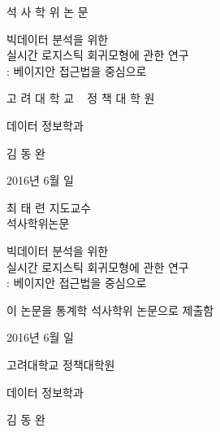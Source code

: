 \documentclass[oneside,b5paper,11pt]{book}
\theoremstyle{plain}
\theoremstyle{definition}
\theoremstyle{remark}
\theoremstyle{definition}
\numberwithin{equation}{chapter}
\begin{document}

 \linespread{1.0}
 \thispagestyle{empty}
 \vspace{37mm}
 \begin{center}
 {\Large 석 사 학 위 논 문}
 \end{center}
 \vspace{30mm}
 \begin{center}
 \LARGE 빅데이터 분석을 위한 \\실시간 로지스틱 회귀모형에 관한 연구\\: 베이지안 접근법을 중심으로
 \end{center}
 \vspace{80mm}
 \begin{center}
 {\Large 고 려 대 학 교 ~ 정 책 대 학 원}
 \end{center}
 \begin{center}
 {\Large 데이터 정보학과}
 \end{center}
 \begin{center}
 {\Large 김 \quad\quad 동 \quad\quad 완}
 \end{center}
  \vspace{7mm}
 \begin{center}
 {\Large 2016년 \quad 6월 \quad 일}
 \end{center}
 \linespread{1.6}





\newpage{}
 \linespread{1.0}
 \thispagestyle{empty}
 \vspace{15mm}
 \begin{center}
 {\Large 최 태 련 지도교수 \\ 석사학위논문
}
 \end{center}
 \vspace{20mm}
 \begin{center}
 \LARGE 빅데이터 분석을 위한 \\실시간 로지스틱 회귀모형에 관한 연구\\: 베이지안 접근법을 중심으로
 \end{center}
 \vspace{20mm}
 \begin{center}
 {\Large 이 논문을 통계학 석사학위 논문으로 제출함}
 \end{center}
 \vspace{35mm}
 \begin{center}
 {\Large 2016년 \quad 6월 \quad 일}
 \end{center}
 \vspace{20mm}
 \begin{center}
 {\Large 고려대학교 정책대학원}
 \end{center}
 \begin{center}
  {\Large 데이터 정보학과}
 \end{center}
 \begin{center}
 {\Large 김 \quad\quad 동 \quad\quad 완}
 \end{center}
 \linespread{1.6}
\end{document}
